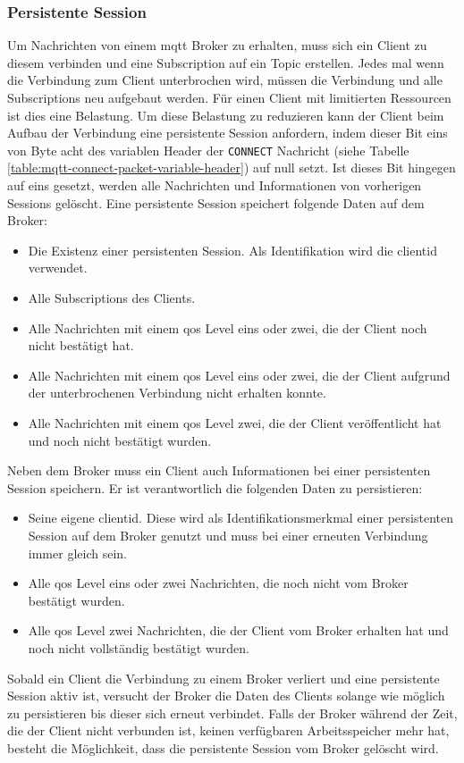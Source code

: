 \subsubsection{Persistente Session} \label{s:persistent-session}
Um Nachrichten von einem \ac{mqtt} Broker zu erhalten, muss sich ein Client zu diesem verbinden und eine Subscription auf ein Topic erstellen.
Jedes mal wenn die Verbindung zum Client unterbrochen wird, müssen die Verbindung und alle Subscriptions neu aufgebaut werden.
Für einen Client mit limitierten Ressourcen ist dies eine Belastung.
Um diese Belastung zu reduzieren kann der Client beim Aufbau der Verbindung eine persistente Session anfordern, indem dieser Bit eins von Byte acht des variablen Header der \verb|CONNECT| Nachricht (siehe Tabelle \ref{table:mqtt-connect-packet-variable-header}) auf null setzt.
Ist dieses Bit hingegen auf eins gesetzt, werden alle Nachrichten und Informationen von vorherigen Sessions gelöscht.
Eine persistente Session speichert folgende Daten auf dem Broker:
\begin{itemize}
    \item Die Existenz einer persistenten Session. Als Identifikation wird die \acs{clientid} verwendet.
    \item Alle Subscriptions des Clients.
    \item Alle Nachrichten mit einem \ac{qos} Level eins oder zwei, die der Client noch nicht bestätigt hat.
    \item Alle Nachrichten mit einem \ac{qos} Level eins oder zwei, die der Client aufgrund der unterbrochenen Verbindung nicht erhalten konnte.
    \item Alle Nachrichten mit einem \ac{qos} Level zwei, die der Client veröffentlicht hat und noch nicht bestätigt wurden.
\end{itemize}
Neben dem Broker muss ein Client auch Informationen bei einer persistenten Session speichern. Er ist verantwortlich die folgenden Daten zu persistieren:
\begin{itemize}
    \item Seine eigene \ac{clientid}. Diese wird als Identifikationsmerkmal einer persistenten Session auf dem Broker genutzt und muss bei einer erneuten Verbindung immer gleich sein.
    \item Alle \ac{qos} Level eins oder zwei Nachrichten, die noch nicht vom Broker bestätigt wurden.
    \item Alle \ac{qos} Level zwei Nachrichten, die der Client vom Broker erhalten hat und noch nicht vollständig bestätigt wurden.
\end{itemize}
Sobald ein Client die Verbindung zu einem Broker verliert und eine persistente Session aktiv ist, versucht der Broker die Daten des Clients solange wie möglich zu persistieren bis dieser sich erneut verbindet. Falls der Broker während der Zeit, die der Client nicht verbunden ist, keinen verfügbaren Arbeitsspeicher mehr hat, besteht die Möglichkeit, dass die persistente Session vom Broker gelöscht wird.
\cite{teamPersistentSessionQueuing}

